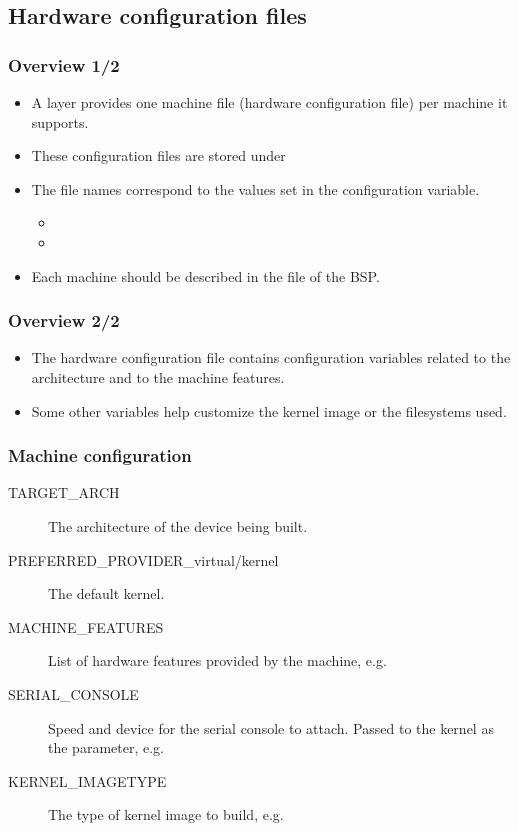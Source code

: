 \subsection{Hardware configuration files}

\begin{frame}
  \frametitle{Overview 1/2}
  \begin{itemize}
    \item A layer provides one machine file (hardware configuration
      file) per machine it supports.
    \item These configuration files are stored under
    \item The file names correspond to the values set in the
       configuration variable.
      \begin{itemize}
        \item {}
        \item {}
      \end{itemize}
    \item Each machine should be described in the  file
      of the BSP.
  \end{itemize}
\end{frame}

\begin{frame}
  \frametitle{Overview 2/2}
  \begin{itemize}
    \item The hardware configuration file contains configuration
      variables related to the architecture and to the machine
      features.
    \item Some other variables help customize the kernel image or the
      filesystems used.
  \end{itemize}
\end{frame}

\begin{frame}
  \frametitle{Machine configuration}
  \begin{description}
    \item[TARGET\_ARCH] The architecture of the device being built.
    \item[PREFERRED\_PROVIDER\_virtual/kernel] The default kernel.
    \item[MACHINE\_FEATURES] List of hardware features provided by the
      machine, e.g. 
    \item[SERIAL\_CONSOLE] Speed and device for the serial console to
      attach. Passed to the kernel as the  parameter,
      e.g. 
    \item[KERNEL\_IMAGETYPE] The type of kernel image to build, e.g.
  \end{description}
\end{frame}

